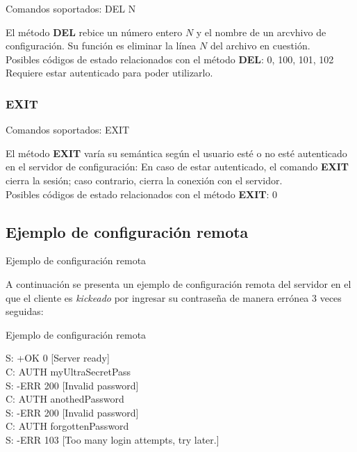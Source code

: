 \documentclass{beamer}
\begin{document}
\begin{frame}{Comandos soportados: DEL N}

\par El método \textbf{DEL} rebice un número entero $N$ y el nombre de un arcvhivo de configuración. Su función es eliminar la línea $N$ del archivo en cuestión. \\[0.5cm]
 Posibles códigos de estado relacionados con el método \textbf{DEL}: 0, 100, 101, 102
 Requiere estar autenticado para poder utilizarlo.
\end{frame}

\subsubsection{EXIT}

\begin{frame}{Comandos soportados: EXIT}

\par El método \textbf{EXIT} varía su semántica según el usuario esté o no esté autenticado en el servidor de configuración: En caso de estar autenticado, el comando \textbf{EXIT} cierra la sesión; caso contrario, cierra la conexión con el servidor.\\[0.5cm]
Posibles códigos de estado relacionados con el método \textbf{EXIT}: 0
\end{frame}

\subsection{Ejemplo de configuración remota}
\begin{frame}{Ejemplo de configuración remota}
\par A continuación se presenta un ejemplo de configuración remota del servidor en el que el cliente es \textit{kickeado} por ingresar su contraseña de manera errónea 3 veces seguidas:

\end{frame}

\begin{frame}[fragile]{Ejemplo de configuración remota}
\begin{block}{}
S: +OK 0 [Server ready]\\
C: AUTH myUltraSecretPass\\
S: -ERR 200 [Invalid password]\\
C: AUTH anothedPassword\\
S: -ERR 200 [Invalid password]\\
C: AUTH forgottenPassword\\
S: -ERR 103 [Too many login attempts, try later.]
\end{block}
\end{frame}
\end{document}
